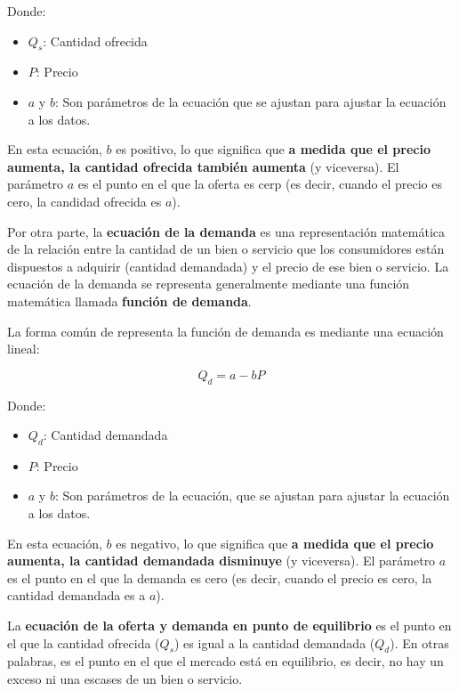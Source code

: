 \documentclass[
  spanish,
  12pt,
]{book}
\providecommand{\tightlist}{%
  \setlength{\itemsep}{0pt}\setlength{\parskip}{0pt}}
\begin{document}
Donde:

\begin{itemize}
\tightlist
\item
  \(Q_{s}\): Cantidad ofrecida
\item
  \(P\): Precio
\item
  \(a\) y \(b\): Son parámetros de la ecuación que se ajustan para
  ajustar la ecuación a los datos.
\end{itemize}

En esta ecuación, \(b\) es positivo, lo que significa que \textbf{a
medida que el precio aumenta, la cantidad ofrecida también aumenta} (y
viceversa). El parámetro \(a\) es el punto en el que la oferta es cerp
(es decir, cuando el precio es cero, la candidad ofrecida es \(a\)).

Por otra parte, la \textbf{ecuación de la demanda} es una representación
matemática de la relación entre la cantidad de un bien o servicio que
los consumidores están dispuestos a adquirir (cantidad demandada) y el
precio de ese bien o servicio. La ecuación de la demanda se representa
generalmente mediante una función matemática llamada \textbf{función de
demanda}.

La forma común de representa la función de demanda es mediante una
ecuación lineal:

\begin{equation}
Q_{d} = a - bP
\end{equation}

Donde:

\begin{itemize}
\tightlist
\item
  \(Q_{d}\): Cantidad demandada
\item
  \(P\): Precio
\item
  \(a\) y \(b\): Son parámetros de la ecuación, que se ajustan para
  ajustar la ecuación a los datos.
\end{itemize}

En esta ecuación, \(b\) es negativo, lo que significa que \textbf{a
medida que el precio aumenta, la cantidad demandada disminuye} (y
viceversa). El parámetro \(a\) es el punto en el que la demanda es cero
(es decir, cuando el precio es cero, la cantidad demandada es a \(a\)).

La \textbf{ecuación de la oferta y demanda en punto de equilibrio} es el
punto en el que la cantidad ofrecida (\(Q_{s}\)) es igual a la cantidad
demandada (\(Q_{d}\)). En otras palabras, es el punto en el que el
mercado está en equilibrio, es decir, no hay un exceso ni una escases de
un bien o servicio.
\end{document}
